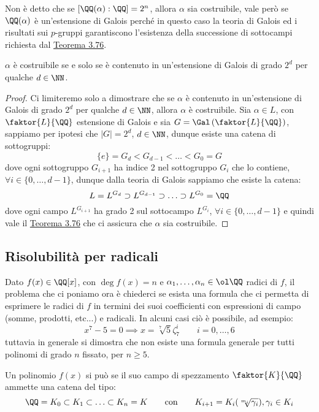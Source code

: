 \documentclass[11pt]{scrartcl}
\begin{document}
\begin{remark}
    Non è detto che se $[\QQ(\alpha) : \QQ] = 2^n$, allora $\alpha$ sia costruibile, vale però se $\QQ(\alpha)$ è un'estensione di Galois perché in questo caso la teoria di Galois ed i risultati sui $p$-gruppi garantiscono l'esistenza 
    della successione di sottocampi richiesta dal \hyperref[3.76]{Teorema 3.76}.
\end{remark}

\begin{theorem}
    $\alpha$ è costruibile se e solo se è contenuto in un'estensione di Galois di grado $2^d$ per qualche $d \in \NN$.
\end{theorem}

\begin{proof}
    Ci limiteremo solo a dimostrare che se $\alpha$ è contenuto in un'estensione di Galois di grado $2^d$ per qualche $d \in \NN$, allora $\alpha$ è costruibile. Sia $\alpha \in L$, con $\faktor{L}{\QQ}$ estensione di Galois e sia $G = \Gal\left(\faktor{L}{\QQ}\right)$, sappiamo 
    per ipotesi che $|G| = 2^d$, $d \in \NN$, dunque esiste una catena di sottogruppi:
    \[ \{e\} = G_d < G_{d-1} < \ldots < G_0 = G
        \] 
    dove ogni sottogruppo $G_{i+1}$ ha indice 2 nel sottogruppo $G_i$ che lo contiene, $\forall i \in \{0,\ldots,d-1\}$, dunque dalla teoria di Galois sappiamo che esiste la catena:
    \[ L = L^{G_d} \supset L^{G_{d-1}} \supset \ldots \supset L^{G_0} = \QQ
        \]
    dove ogni campo $L^{G_{i+1}}$ ha grado 2 sul sottocampo $L^{G_{i}}$, $\forall i \in \{0,\ldots,d-1\}$ e quindi vale il \hyperref[3.76]{Teorema 3.76} che ci assicura che $\alpha$ sia costruibile.
\end{proof}

\newpage
\subsection{Risolubilità per radicali}
Dato $f(x) \in \QQ[x]$, con $\deg f(x) = n$ e $\alpha_1,\ldots,\alpha_n \in \ol \QQ$ radici di $f$, il problema che ci poniamo ora è chiederci se esista una formula che ci permetta di esprimere le radici di $f$
in termini dei suoi coefficienti con espressioni di campo (somme, prodotti, etc...) e radicali. In alcuni casi ciò è possibile, ad esempio:
\[ x^7 - 5 = 0 \implies x = \sqrt[7]{5}\zeta_7^i \qquad i = 0,\ldots,6
    \]
tuttavia in generale  si dimostra che non esiste una formula generale per tutti polinomi di grado $n$ fissato, per $n \geq 5$.

\begin{definition}
    Un polinomio $f(x)$ si può  se il suo campo di spezzamento $\faktor{K}{\QQ}$ ammette una catena del tipo:
    \[ \QQ = K_0 \subset K_1 \subset \ldots \subset K_n = K \qquad \text{con} \qquad K_{i+1} = K_i(\sqrt[m_i]{\gamma_i}), \gamma_i \in K_i
        \]
\end{definition}
\end{document}

